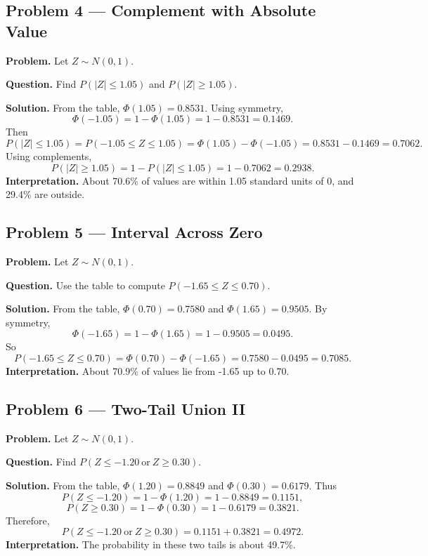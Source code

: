 \begin{ExamProblems}

\item
\subsection*{Problem 4 --- Complement with Absolute Value}

\textbf{Problem.}
Let \(Z\sim N(0,1)\).

\textbf{Question.} Find \(P(|Z|\le 1.05)\) and \(P(|Z|\ge 1.05)\).

\textbf{Solution.}
From the table, \(\Phi(1.05)=0.8531\).
Using symmetry,
\[
\Phi(-1.05)=1-\Phi(1.05)=1-0.8531=0.1469.
\]
Then
\[
P(|Z|\le 1.05)=P(-1.05\le Z\le 1.05)=\Phi(1.05)-\Phi(-1.05)=0.8531-0.1469=0.7062.
\]
Using complements,
\[
P(|Z|\ge 1.05)=1-P(|Z|\le 1.05)=1-0.7062=0.2938.
\]
\textbf{Interpretation.} About 70.6\% of values are within 1.05 standard units of 0, and 29.4\% are outside.


\item
\subsection*{Problem 5 --- Interval Across Zero}

\textbf{Problem.}
Let \(Z\sim N(0,1)\).

\textbf{Question.} Use the table to compute \(P(-1.65\le Z\le 0.70)\).

\textbf{Solution.}
From the table, \(\Phi(0.70)=0.7580\) and \(\Phi(1.65)=0.9505\).
By symmetry,
\[
\Phi(-1.65)=1-\Phi(1.65)=1-0.9505=0.0495.
\]
So
\[
P(-1.65\le Z\le 0.70)=\Phi(0.70)-\Phi(-1.65)=0.7580-0.0495=0.7085.
\]
\textbf{Interpretation.} About 70.9\% of values lie from -1.65 up to 0.70.


\item
\subsection*{Problem 6 --- Two-Tail Union II}

\textbf{Problem.}
Let \(Z\sim N(0,1)\).

\textbf{Question.} Find \(P(Z\le -1.20\ \text{or}\ Z\ge 0.30)\).

\textbf{Solution.}
From the table, \(\Phi(1.20)=0.8849\) and \(\Phi(0.30)=0.6179\).
Thus
\[
P(Z\le -1.20)=1-\Phi(1.20)=1-0.8849=0.1151,
\]
\[
P(Z\ge 0.30)=1-\Phi(0.30)=1-0.6179=0.3821.
\]
Therefore,
\[
P(Z\le -1.20\ \text{or}\ Z\ge 0.30)=0.1151+0.3821=0.4972.
\]
\textbf{Interpretation.} The probability in these two tails is about 49.7\%.


\end{ExamProblems}
